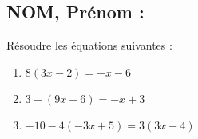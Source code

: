\documentclass[a4paper,11pt,exos]{nsi} %
\begin{document}
\subsection*{NOM, Prénom : \dotfill} 


\maketitle




\begin{exercice}
Résoudre les équations suivantes :
\begin{multicols}{3}
	\begin{enumerate}
		\item $8(3x-2)=-x-6$
        \item $3-(9x-6)=-x+3$
		\item $-10-4(-3x+5)=3(3x-4)$
	\end{enumerate}
\end{multicols}

\end{exercice}

\end{document}
